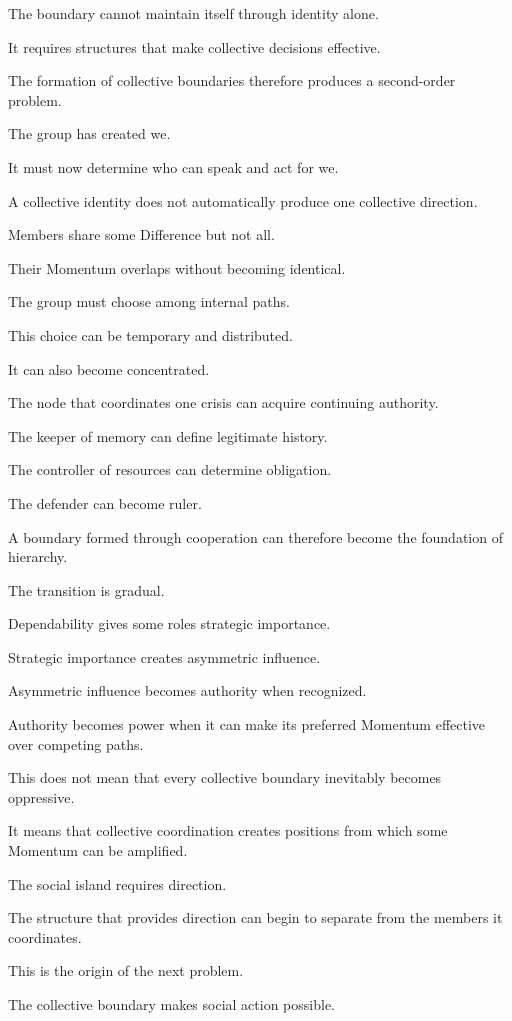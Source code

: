 The boundary cannot maintain itself through identity alone.

It requires structures that make collective decisions effective.

The formation of collective boundaries therefore produces a second-order problem.

The group has created we.

It must now determine who can speak and act for we.

A collective identity does not automatically produce one collective direction.

Members share some Difference but not all.

Their Momentum overlaps without becoming identical.

The group must choose among internal paths.

This choice can be temporary and distributed.

It can also become concentrated.

The node that coordinates one crisis can acquire continuing authority.

The keeper of memory can define legitimate history.

The controller of resources can determine obligation.

The defender can become ruler.

A boundary formed through cooperation can therefore become the foundation of hierarchy.

The transition is gradual.

Dependability gives some roles strategic importance.

Strategic importance creates asymmetric influence.

Asymmetric influence becomes authority when recognized.

Authority becomes power when it can make its preferred Momentum effective over competing paths.

This does not mean that every collective boundary inevitably becomes oppressive.

It means that collective coordination creates positions from which some Momentum can be amplified.

The social island requires direction.

The structure that provides direction can begin to separate from the members it coordinates.

This is the origin of the next problem.

The collective boundary makes social action possible.


